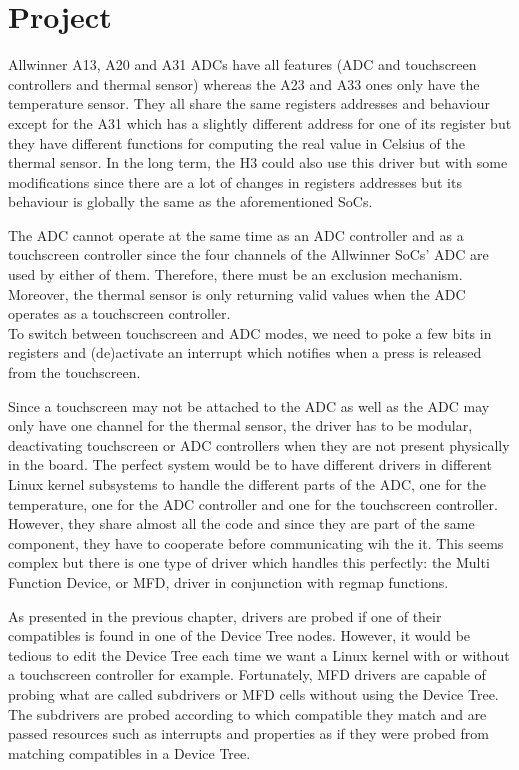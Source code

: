 \section{Project}

Allwinner A13, A20 and A31 ADCs have all features (ADC and touchscreen controllers and thermal sensor) whereas the A23 and A33 ones only have the temperature sensor. They all share the same registers addresses and behaviour except for the A31 which has a slightly different address for one of its register but they have different functions for computing the real value in Celsius of the thermal sensor. In the long term, the H3 could also use this driver but with some modifications since there are a lot of changes in registers addresses but its behaviour is globally the same as the aforementioned SoCs.

The ADC cannot operate at the same time as an ADC controller and as a touchscreen controller since the four channels of the Allwinner SoCs' ADC are used by either of them. Therefore, there must be an exclusion mechanism. Moreover, the thermal sensor is only returning valid values when the ADC operates as a touchscreen controller.\\
To switch between touchscreen and ADC modes, we need to poke a few bits in registers and (de)activate an interrupt which notifies when a press is released from the touchscreen.

Since a touchscreen may not be attached to the ADC as well as the ADC may only have one channel for the thermal sensor, the driver has to be modular, deactivating touchscreen or ADC controllers when they are not present physically in the board. The perfect system would be to have different drivers in different Linux kernel subsystems to handle the different parts of the ADC, one for the temperature, one for the ADC controller and one for the touchscreen controller. However, they share almost all the code and since they are part of the same component, they have to cooperate before communicating wih the it. This seems complex but there is one type of driver which handles this perfectly: the Multi Function Device, or MFD, driver in conjunction with regmap functions.

As presented in the previous chapter, drivers are probed if one of their compatibles is found in one of the Device Tree nodes. However, it would be tedious to edit the Device Tree each time we want a Linux kernel with or without a touchscreen controller for example. Fortunately, MFD drivers are capable of probing what are called subdrivers or MFD cells without using the Device Tree. The subdrivers are probed according to which compatible they match and are passed resources such as interrupts and properties as if they were probed from matching compatibles in a Device Tree.

